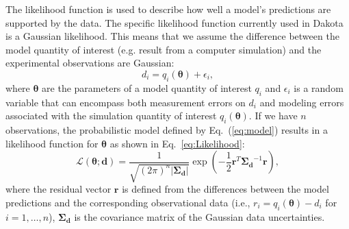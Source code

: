 The likelihood function is used to describe how well a model's
predictions are supported by the data.  
The specific likelihood function currently used in Dakota is a Gaussian
likelihood. This means that we assume the difference between the model quantity of interest
(e.g. result from a computer simulation) and the experimental observations are Gaussian:
\begin{equation}
d_i = q_i(\boldsymbol{\theta}) + \epsilon_i, \label{eq:model}
\end{equation}
where $\boldsymbol{\theta}$ are the parameters of a model quantity of interest $q_i$ and
$\epsilon_i$ is a random variable that can encompass both measurement
errors on $d_i$ and modeling errors associated with the simulation quantity of interest 
$q_i(\boldsymbol{\theta})$. %
If we have $n$ observations, the probabilistic model defined by 
Eq.~(\ref{eq:model}) results in a likelihood function for $\boldsymbol{\theta}$ 
as shown in Eq.~\ref{eq:Likelihood}:
\begin{equation}
\mathcal{L}(\boldsymbol{\theta;d}) = 
\frac{1}{\sqrt{(2\pi)^n |\boldsymbol{\Sigma_d}|}}
\exp \left(
-\frac{1}{2} \boldsymbol{r}^T \boldsymbol{\Sigma_d}^{-1} \boldsymbol{r} 
\right), \label{eq:Likelihood}
\end{equation}
where the residual vector $\boldsymbol{r}$ is defined from the
differences between the model predictions and the corresponding
observational data (i.e., $r_i = q_i(\boldsymbol{\theta}) - d_i$ for $i = 1,\dots,n$),
$\boldsymbol{\Sigma_d}$ is the covariance matrix of the Gaussian data
uncertainties. %

